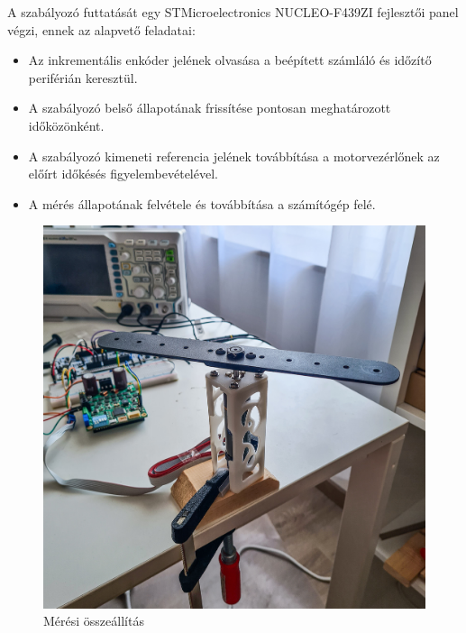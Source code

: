 A szabályozó futtatását egy STMicroelectronics NUCLEO-F439ZI fejlesztői panel végzi, ennek az alapvető feladatai:
\begin{itemize}
    \item Az inkrementális enkóder jelének olvasása a beépített számláló és időzítő periférián keresztül.
    \item A szabályozó belső állapotának frissítése pontosan meghatározott időközönként.
    \item A szabályozó kimeneti referencia jelének továbbítása a motorvezérlőnek az előírt időkésés figyelembevételével.
    \item A mérés állapotának felvétele és továbbítása a számítógép felé.
\end{itemize}

\begin{figure}[b!]
	\begin{center}
		\includegraphics[width=14cm]{images/setup_experiment.jpg}
		\caption{Mérési összeállítás}\label{fig:setup_experiment}
	\end{center}
\end{figure}


